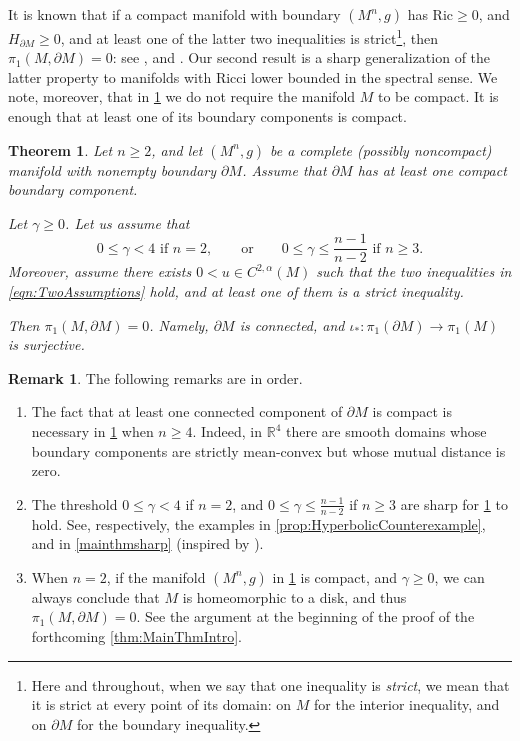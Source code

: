 \documentclass[12pt,a4paper,reqno]{amsart}
\newtheorem{theorem}{Theorem}
\theoremstyle{definition}
\newtheorem{remark}{Remark}
\renewcommand{\leq}{\leqslant}
\renewcommand{\geq}{\geqslant}
\begin{document}
It is known that if a compact manifold with boundary $(M^n,g)$ has $\mathrm{Ric}\geq 0$, and $H_{\partial M}\geq 0$, and at least one of the latter two inequalities is strict\footnote{Here and throughout, when we say that one inequality is \textit{strict},
we mean that it is strict at every point of its domain: on $M$ for the
interior inequality, and on $\partial M$ for the boundary inequality.}, then $\pi_1(M,\partial M)=0$: see \cite[Proposition 2.8]{FraserLi}, and \cite{LawsonUnknot}. Our second result is a sharp generalization of the latter property to manifolds with Ricci lower bounded in the spectral sense. We note, moreover, that in \cref{thm:Pi10} we do not require the manifold $M$ to be compact. It is enough that at least one of its boundary components is compact. 
\begin{theorem}\label{thm:Pi10}
    Let $n\geq 2$, and let $(M^n,g)$ be a complete (possibly noncompact) manifold with nonempty boundary $\partial M$. Assume that $\partial M$ has at least one compact boundary component.
    
    Let $\gamma\geq 0$. Let us assume that 
    \[
    0\leq \gamma < 4\,\, \text{if $n=2$}, \qquad \text{or} \qquad  0\leq \gamma\leq \frac{n-1}{n-2}\,\, \text{if $n\geq 3$}.
    \]
Moreover, assume there exists $0<u\in C^{2,\alpha}(M)$ such that the two inequalities in \eqref{eqn:TwoAssumptions} hold, and at least one of them is a strict inequality. 

Then $\pi_1(M,\partial M)=0$. Namely, $\partial M$ is connected, and $\iota_*:\pi_1(\partial M)\to\pi_1(M)$ is surjective.
\end{theorem}
\begin{remark}
    The following remarks are in order.
    \begin{enumerate}
    \item The fact that at least one connected component of $\partial M$ is compact is necessary in \cref{thm:Pi10} when $n\geq 4$. Indeed, in $\mathbb R^4$ 
there are smooth domains whose boundary components are
strictly mean-convex but whose mutual distance is zero.
    \item The threshold
    $0
    \leq \gamma<4$ if $n=2$, and 
    $0\leq \gamma\leq \frac{n-1}{n-2}$ if $n\geq 3$ are sharp for \cref{thm:Pi10} to hold. See, respectively, the examples in \cref{prop:HyperbolicCounterexample}, and in \cref{mainthmsharp} (inspired by \cite{AX25}).
    \item When $n=2$, if the manifold $(M^n,g)$ in \cref{thm:Pi10} is compact, and $\gamma\geq 0$, we can always conclude that $M$ is homeomorphic to a disk, and thus $\pi_1(M,\partial M)=0$. See the argument at the beginning of the proof of the forthcoming \cref{thm:MainThmIntro}.
    \end{enumerate}
\end{remark}
\end{document}
